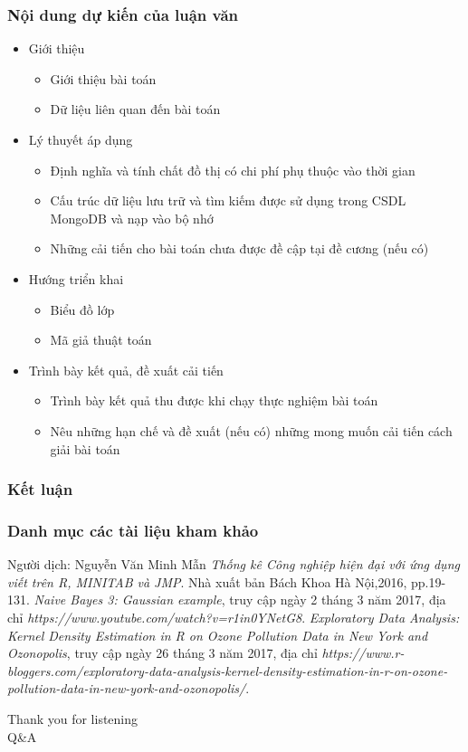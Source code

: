 \documentclass{beamer}
\begin{document}
\begin{frame}
\frametitle{Nội dung dự kiến của luận văn}
\begin{itemize}
\item Giới thiệu
	\begin{itemize}
	\item Giới thiệu bài toán
	\item Dữ liệu liên quan đến bài toán
	\end{itemize}
\item Lý thuyết áp dụng
	\begin{itemize}
	\item Định nghĩa và tính chất đồ thị có chi phí phụ thuộc vào thời gian
	\item Cấu trúc dữ liệu lưu trữ và tìm kiếm được sử dụng trong CSDL MongoDB và nạp vào bộ nhớ
	\item Những cải tiến cho bài toán chưa được đề cập tại đề cương (nếu có)	
	\end{itemize}
\item Hướng triển khai
	\begin{itemize}
	\item Biểu đồ lớp
	\item Mã giả thuật toán
	\end{itemize}
\item Trình bày kết quả, đề xuất cải tiến
	\begin{itemize}
	\item Trình bày kết quả thu được khi chạy thực nghiệm bài toán
	\item Nêu những hạn chế và đề xuất (nếu có) những mong muốn cải tiến cách giải bài toán
	\end{itemize}
\end{itemize}
\end{frame}
\begin{frame}
\frametitle{Kết luận}
\end{frame}
\begin{frame}
\frametitle{Danh mục các tài liệu kham khảo}
\begin{thebibliography}{}
 Người dịch: Nguyễn Văn Minh Mẫn \emph{Thống kê Công nghiệp hiện đại với ứng dụng viết trên R, MINITAB và JMP}. Nhà xuất bản Bách Khoa Hà Nội,2016, pp.19-131.
	\emph{Naive Bayes 3: Gaussian example}, truy cập ngày 2 tháng 3 năm 2017,
	địa chỉ \emph{https://www.youtube.com/watch?v=r1in0YNetG8}.	
	\emph{Exploratory Data Analysis: Kernel Density Estimation in R on Ozone Pollution Data in New York and Ozonopolis}, truy cập ngày 26 tháng 3 năm 2017,
	địa chỉ \emph{https://www.r-bloggers.com/exploratory-data-analysis-kernel-density-estimation-in-r-on-ozone-pollution-data-in-new-york-and-ozonopolis/}.
\end{thebibliography}
\end{frame}

\begin{frame}[c]{ }
\begin{Huge}
\centering
Thank you for listening\\Q\&A\\
\end{Huge}
\end{frame}
\end{document}
